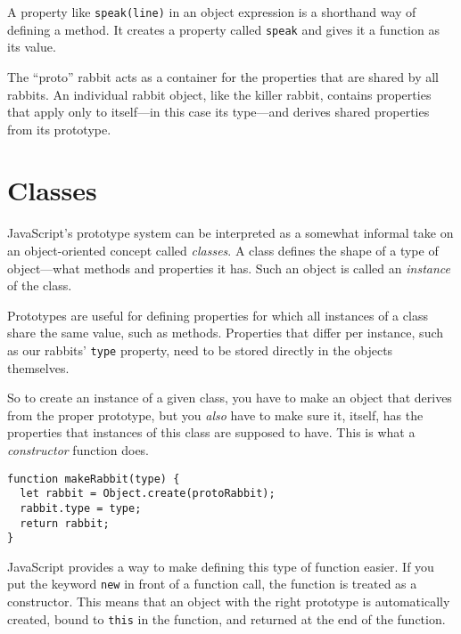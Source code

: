 A property like \lstinline`speak(line)` in an object expression is a shorthand way of defining a method. It creates a property called \lstinline`speak` and gives it a function as its value.

The ``proto'' rabbit acts as a container for the properties that are shared by all rabbits. An individual rabbit object, like the killer rabbit, contains properties that apply only to itself—in this case its type—and derives shared properties from its prototype.

\label{object.classes}\section{Classes}

JavaScript's prototype system can be interpreted as a somewhat informal take on an object-oriented concept called \emph{classes}. A class defines the shape of a type of object—what methods and properties it has. Such an object is called an \emph{instance} of the class.

Prototypes are useful for defining properties for which all instances of a class share the same value, such as methods. Properties that differ per instance, such as our rabbits' \lstinline`type` property, need to be stored directly in the objects themselves.

\label{object.constructors}So to create an instance of a given class, you have to make an object that derives from the proper prototype, but you \emph{also} have to make sure it, itself, has the properties that instances of this class are supposed to have. This is what a \emph{constructor} function does.

\begin{lstlisting}
function makeRabbit(type) {
  let rabbit = Object.create(protoRabbit);
  rabbit.type = type;
  return rabbit;
}
\end{lstlisting}
\noindent{}

JavaScript provides a way to make defining this type of function easier. If you put the keyword \lstinline`new` in front of a function call, the function is treated as a constructor. This means that an object with the right prototype is automatically created, bound to \lstinline`this` in the function, and returned at the end of the function.

